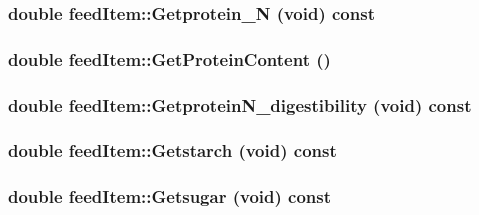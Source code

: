 \label{classfeed_item_a6721f9ea04781bf19ee97e9fbbcb32bb}
\hypertarget{classfeed_item_ae861dd22a8969ae2dabb00a2045f007c}{
\subsubsection[{Getprotein\_\-N}]{\setlength{\rightskip}{0pt plus 5cm}double feedItem::Getprotein\_\-N (void) const}}
\label{classfeed_item_ae861dd22a8969ae2dabb00a2045f007c}
\hypertarget{classfeed_item_a9108f7c64a99965e0275b63c76a15f5b}{
\subsubsection[{GetProteinContent}]{\setlength{\rightskip}{0pt plus 5cm}double feedItem::GetProteinContent ()}}
\label{classfeed_item_a9108f7c64a99965e0275b63c76a15f5b}
\hypertarget{classfeed_item_ac8e08bb19948212eccc3373ef2723be7}{
\subsubsection[{GetproteinN\_\-digestibility}]{\setlength{\rightskip}{0pt plus 5cm}double feedItem::GetproteinN\_\-digestibility (void) const}}
\label{classfeed_item_ac8e08bb19948212eccc3373ef2723be7}
\hypertarget{classfeed_item_a59a3cebd74f8c35ac5f4459ea9d837a1}{
\subsubsection[{Getstarch}]{\setlength{\rightskip}{0pt plus 5cm}double feedItem::Getstarch (void) const}}
\label{classfeed_item_a59a3cebd74f8c35ac5f4459ea9d837a1}
\hypertarget{classfeed_item_a3f055d5bbb0f6466051560ce8806ed3f}{
\subsubsection[{Getsugar}]{\setlength{\rightskip}{0pt plus 5cm}double feedItem::Getsugar (void) const}}
